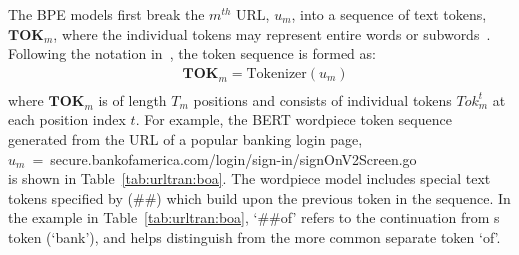 The BPE models first break the $m^{th}$ URL, $u_m$, into a sequence of text tokens, $\mathbf{TOK}_m$, where the individual tokens  may represent entire words or subwords~\citep{schuster2012japanese,sennrich2016neural,wu2016googles}.
Following the notation in~\cite{devlin2019bert}, the token sequence is formed as:
\begin{equation}
	\begin{split}
		& \mathbf{TOK}_m = \text{Tokenizer}(u_m)\\
	\end{split}
\label{eq:urltran:tok}
\end{equation}
\noindent where $\mathbf{TOK}_m$ is of length $T_m$ positions and consists of individual tokens ${Tok}_m^t$ at each position index $t$.
For example, the BERT wordpiece token sequence generated from the URL of a popular banking login page,\\
\mbox{\small{$u_m$ = secure.bankofamerica.com/login/sign-in/signOnV2Screen.go}} \\
 is shown in Table~\ref{tab:urltran:boa}. The wordpiece model includes special text tokens specified by (\#\#) which build
 upon the previous token in the sequence. In the example in Table~\ref{tab:urltran:boa}, `\#\#of' refers to the continuation from s
 token (`bank'), and helps distinguish from the more common  separate token `of'.

\begin{table}
\centering
{}
\caption{Example of the wordpiece token sequence extraction from a popular banking web page.}
\label{tab:urltran:boa}
\end{table}


